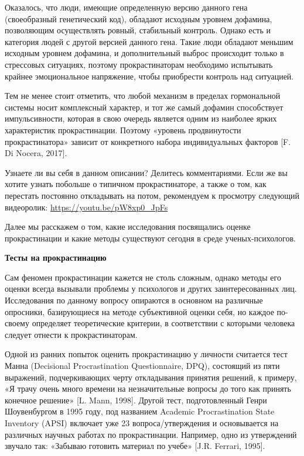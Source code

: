 Оказалось, что люди, имеющие определенную версию данного гена (своеобразный генетический код), обладают исходным уровнем дофамина, позволяющим осуществлять ровный, стабильный контроль. Однако есть и категория людей с другой версией данного гена. Такие люди обладают меньшим исходным уровнем дофамина, и дополнительный выброс происходит только в стрессовых ситуациях, поэтому прокрастинаторам необходимо испытывать крайнее эмоциональное напряжение, чтобы приобрести контроль над ситуацией.

Тем не менее стоит отметить, что любой механизм в пределах гормональной системы носит комплексный характер, и тот же самый дофамин способствует импульсивности, которая в свою очередь является одним из наиболее ярких характеристик прокрастинации. Поэтому «уровень продвинутости прокрастинатора» зависит от конкретного набора индивидуальных факторов [F. Di Nocera, 2017].



\begin{fancyquotes}
    Узнаете ли вы себя в данном описании? Делитесь комментариями. Если же вы хотите узнать побольше о типичном прокрастинаторе, а также о том, как перестать постоянно откладывать на потом, рекомендуем к просмотру следующий видеоролик: \url{https://youtu.be/pW8xp0_JpFs}
\end{fancyquotes}

Далее мы расскажем о том, какие исследования посвящались оценке прокрастинации и какие методы существуют сегодня в среде ученых-психологов.

\textbf{Тесты на прокрастинацию}

Сам феномен прокрастинации кажется не столь сложным, однако методы его оценки всегда вызывали проблемы у психологов и других заинтересованных лиц. Исследования по данному вопросу опираются в основном на различные опросники, базирующиеся на методе субъективной оценки себя, но каждое по-своему определяет теоретические критерии, в соответствии с которыми человека следует отнести к прокрастинаторам.

Одной из ранних попыток оценить прокрастинацию у личности считается тест Манна (Decisional Procrastination Questionnaire, DPQ), состоящий из пяти выражений, подчеркивающих черту откладывания принятия решений, к примеру, «Я трачу очень много времени на незначительные вопросы до того как принять конечное решение» [L. Mann, 1998]. Другой тест, подготовленный Генри Шоувенбургом в 1995 году, под названием Academic Procrastination State Inventory (APSI) включает уже 23 вопроса/утверждения и основывается на различных научных работах по прокрастинации. Например, одно из утверждений звучало так: «Забываю готовить материал по учебе» [J.R. Ferrari, 1995].

